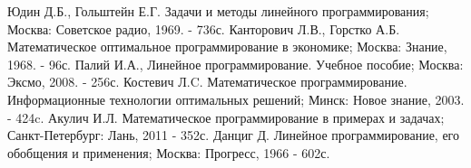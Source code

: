 \documentclass[a4paper,12pt]{article}
\begin{document}
	\clearpage

	\begin{thebibliography}{3}
		Юдин Д.Б., Гольштейн Е.Г. Задачи и методы линейного программирования;
		Москва: Советское радио, 1969. - 736с.
		Канторович Л.В., Горстко А.Б. Математическое оптимальное программирование  в экономике;
		Москва: Знание, 1968. - 96с.
		Палий И.А., Линейное программирование. Учебное пособие;
		Москва: Эксмо, 2008. - 256с.
		Костевич Л.C. Математическое программирование. Информационные технологии оптимальных решений;
		Минск: Новое знание, 2003. - 424c.
		Акулич И.Л. Математическое программирование в примерах и задачах; Санкт-Петербург: Лань, 2011 - 352с.
		Данциг Д. Линейное программирование, его обобщения и применения; Москва: Прогресс, 1966 - 602с.
	\end{thebibliography}
\end{document}
